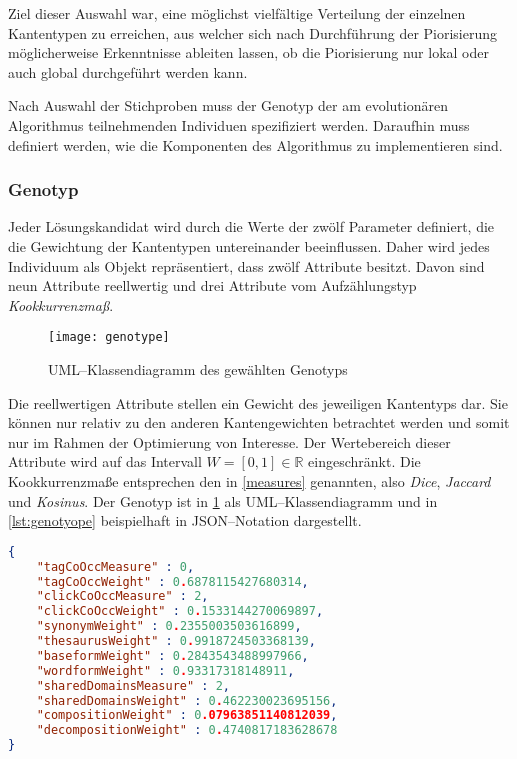 Ziel dieser Auswahl war, eine möglichst vielfältige Verteilung der einzelnen Kantentypen zu erreichen, aus welcher sich nach Durchführung der Piorisierung möglicherweise Erkenntnisse ableiten lassen, ob die Piorisierung nur lokal oder auch global durchgeführt werden kann.

Nach Auswahl der Stichproben muss der Genotyp der am evolutionären Algorithmus teilnehmenden Individuen spezifiziert werden. Daraufhin muss definiert werden, wie die Komponenten des Algorithmus zu implementieren sind.

\subsubsection{Genotyp}

Jeder Lösungskandidat wird durch die Werte der zwölf Parameter definiert, die die Gewichtung der Kantentypen untereinander beeinflussen. Daher wird jedes Individuum als Objekt repräsentiert, dass zwölf Attribute besitzt. Davon sind neun Attribute reellwertig und drei Attribute vom Aufzählungstyp \emph{Kookkurrenzmaß}.

\begin{figure}
\centering
\texttt{[image: genotype]}
\caption{UML--Klassendiagramm des gewählten Genotyps}
\label{fig:genotype}
\end{figure}

Die reellwertigen Attribute stellen ein Gewicht des jeweiligen Kantentyps dar. Sie können nur relativ zu den anderen Kantengewichten betrachtet werden und somit nur im Rahmen der Optimierung von Interesse. Der Wertebereich dieser Attribute wird auf das Intervall \(W=[0,1] \in \mathbb{R}\) eingeschränkt. Die Kookkurrenzmaße entsprechen den in \cref{measures} genannten, also \emph{Dice}, \emph{Jaccard} und \emph{Kosinus}. Der Genotyp ist in \cref{fig:genotype} als UML--Klassendiagramm und in \cref{lst:genotyope} beispielhaft in JSON--Notation dargestellt.

\begin{lstlisting}[language=json, label={lst:genotyope}, caption={JSON--Beispiel für ein Individuum}, float=b]
{
    "tagCoOccMeasure" : 0,
    "tagCoOccWeight" : 0.6878115427680314,
    "clickCoOccMeasure" : 2,
    "clickCoOccWeight" : 0.1533144270069897,
    "synonymWeight" : 0.2355003503616899,
    "thesaurusWeight" : 0.9918724503368139,
    "baseformWeight" : 0.2843543488997966,
    "wordformWeight" : 0.93317318148911,
    "sharedDomainsMeasure" : 2,
    "sharedDomainsWeight" : 0.462230023695156,
    "compositionWeight" : 0.07963851140812039,
    "decompositionWeight" : 0.4740817183628678
}
\end{lstlisting}


